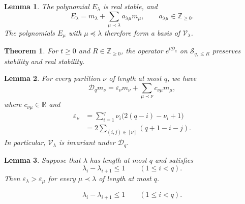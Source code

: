\documentclass[10pt,a4paper]{amsart}
\newtheorem{lemma}{Lemma}
\newtheorem{theorem}{Theorem}
\newcommand{\NN}{\mathbb Z_{\geq0}}
\newcommand{\RR}{\mathbb R}
\begin{document}
\begin{lemma}\label{st:elementary-unitriangular}
The polynomial $E_\lambda$ is real stable, and
\begin{equation}\label{st:elementary-triangular}
E_\lambda=m_\lambda+
 \sum_{\mu\prec\lambda}a_{\lambda\mu}m_\mu,
\qquad a_{\lambda\mu}\in\NN.
\end{equation}
The polynomials $E_\mu$ with $\mu\preceq\lambda$ therefore form
a basis of $\mathcal V_\lambda$.
\end{lemma}

\begin{theorem}\label{st:evolution-preserves}
For $t\geq0$ and $R\in\NN$, the operator $e^{t\mathcal D_q}$
on $\mathcal S_{q,\leq R}$ preserves stability and real stability.
\end{theorem}

\begin{lemma}\label{st:operator-triangular}
For every partition $\nu$ of length at most $q$, we have 
\begin{equation}\label{st:triangular-operator}
\mathcal D_q m_\nu=\varepsilon_\nu m_\nu+\sum_{\mu\prec\nu}c_{\nu\mu}m_\mu,
\end{equation}
where $c_{\nu\mu}\in\RR$ and
\begin{align}
\varepsilon_\nu&=\sum_{i=1}^q\nu_i\bigl(2(q-i)-\nu_i+1\bigr)\label{st:eigenvalue}\\
&=2\sum_{(i,j)\in[\nu]}(q+1-i-j).\label{st:eigenvalue-diagram}
\end{align}
In particular, $\mathcal V_\lambda$ is invariant under $\mathcal D_q$.
\end{lemma}

\begin{lemma}\label{st:spectral-gap}
Suppose that $\lambda$ has length at most $q$ and satisfies
\begin{equation}\label{st:adjacent-drop}
\lambda_i-\lambda_{i+1}\leq1\qquad(1\leq i<q).
\end{equation}
Then $\varepsilon_\lambda>\varepsilon_\mu$ for every
$\mu\prec\lambda$ of length at most $q$.
\end{lemma}

\begin{equation}
\lambda_i-\lambda_{i+1}\leq1\qquad(1\leq i<q).
\end{equation}
\end{document}
